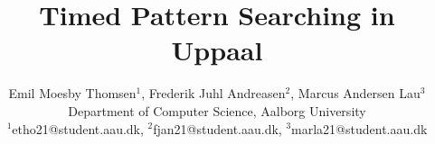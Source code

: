 \documentclass{article}
\begin{document}


\title{Timed Pattern Searching in Uppaal}


\author{Emil Moesby Thomsen$^1$, Frederik Juhl Andreasen$^2$, Marcus Andersen Lau$^3$\\
    \small{Department of Computer Science, Aalborg University}\\
    \small{$^1$etho21@student.aau.dk, $^2$fjan21@student.aau.dk, $^3$marla21@student.aau.dk}}
\maketitle

\begin{multicols}{2}
    
    
    
    
    
    
    
\end{multicols}

\printbibliography
\end{document}
